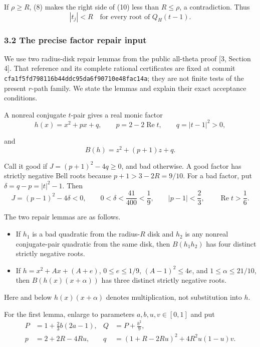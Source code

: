 \documentclass[
  11pt,
  a4paper,
]{article}
\providecommand{\tightlist}{%
  \setlength{\itemsep}{0pt}\setlength{\parskip}{0pt}}
\begin{document}
If \(\rho\geq R\), (8) makes the right side of (10) less than
\(R\leq\rho\), a contradiction. Thus
\nopagebreak
\[
|t_j|<R\quad\text{for every root of }Q_H(t-1).\tag{11}
\]

\subsubsection{3.2 The precise factor repair
input}\label{the-precise-factor-repair-input}

We use two radius-disk repair lemmas from the public all-theta proof
{[}3, Section 4{]}. That reference and its complete rational
certificates are fixed at commit
\texttt{\nolinkurl{cfa1f5fd798116b44ddc95da6f90710e48fac14a}}; they are
not finite tests of the present \(r\)-path family. We state the lemmas
and explain their exact acceptance conditions.

A nonreal conjugate \(t\)-pair gives a real monic factor
\nopagebreak
\[
h(x)=x^2+px+q,\qquad p=2-2\operatorname{Re}t,\qquad q=|t-1|^2>0,
\]

and
\nopagebreak
\[
B(h)=z^2+(p+1)z+q.
\]

Call it good if \(J=(p+1)^2-4q\geq0\), and bad otherwise. A good factor
has strictly negative Bell roots because \(p+1>3-2R=9/10\). For a bad
factor, put \(\delta=q-p=|t|^2-1\). Then
\nopagebreak
\[
J=(p-1)^2-4\delta<0,\qquad
0<\delta<\frac{41}{400}<\frac19,
\qquad |p-1|<\frac23,
\qquad \operatorname{Re}t>\frac16.\tag{12}
\]

The two repair lemmas are as follows.

\begin{itemize}
\tightlist
\item
  If \(h_1\) is a bad quadratic from the radius-\(R\) disk and \(h_2\)
  is any nonreal conjugate-pair quadratic from the same disk, then
  \(B(h_1h_2)\) has four distinct strictly negative roots.
\item
  If \(h=x^2+Ax+(A+e)\), \(0\leq e\leq1/9\), \((A-1)^2\leq4e\), and
  \(1\leq\alpha\leq21/10\), then \(B(h(x)(x+\alpha))\) has three
  distinct strictly negative roots.
\end{itemize}

Here and below \(h(x)(x+\alpha)\) denotes multiplication, not
substitution into \(h\).

For the first lemma, enlarge to parameters \(a,b,u,v\in[0,1]\) and put
\nopagebreak
\[
\begin{aligned}
P&=1+\frac23b(2a-1),&Q&=P+\frac{b^2}{9},\\
p&=2+2R-4Ru,&q&=(1+R-2Ru)^2+4R^2u(1-u)v.
\end{aligned}\tag{13}
\]
\end{document}
